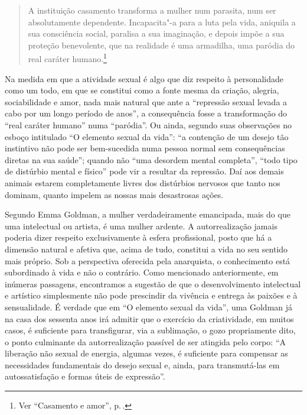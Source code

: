 \begin{quote}
A instituição casamento transforma a mulher num parasita, num ser
absolutamente dependente. Incapacita"-a para a luta pela vida, aniquila a
sua consciência social, paralisa a sua imaginação, e depois impõe a sua
proteção benevolente, que na realidade é uma armadilha, uma paródia do
real caráter humano.\footnote{Ver ``Casamento e amor'', p.\,\pageref{parasita}.}
\end{quote}

Na medida em que a
atividade sexual é algo que diz respeito à personalidade como um todo,
em que se constitui como a fonte mesma da criação, alegria,
sociabilidade e amor, nada mais natural que ante a ``repressão sexual
levada a cabo por um longo período de anos'', a consequência fosse
a transformação do ``real caráter humano'' numa
``paródia''. Ou ainda, segundo suas observações no esboço intitulado ``O
elemento sexual da vida'': ``a contenção de um desejo tão instintivo não
pode ser bem-sucedida numa pessoa normal sem consequências diretas na
sua saúde''; quando não ``uma desordem mental completa'', ``todo tipo de
distúrbio mental e físico'' pode vir a resultar da repressão. Daí aos
demais animais estarem completamente livres dos distúrbios nervosos que
tanto nos dominam, quanto impelem as nossas mais desastrosas ações.

Segundo Emma Goldman, a mulher verdadeiramente emancipada, mais do que
uma intelectual ou artista, é uma mulher ardente. A autorrealização
jamais poderia dizer respeito exclusivamente à esfera profissional,
posto que há a dimensão natural e afetiva que, acima de tudo, constitui
a vida no seu sentido mais próprio. Sob a perspectiva oferecida pela
anarquista, o conhecimento está subordinado à vida e não o contrário.
Como mencionado anteriormente, em inúmeras passagens, encontramos a
sugestão de que o desenvolvimento intelectual e artístico simplesmente
não pode prescindir da vivência e entrega às paixões e à sensualidade. É
verdade que em ``O elemento sexual da vida'', uma Goldman já na casa dos
sessenta anos irá admitir que o exercício da criatividade, em muitos
casos, é suficiente para transfigurar, via a sublimação, o gozo
propriamente dito, o ponto culminante da autorrealização passível de ser
atingida pelo corpo: ``A liberação não sexual de energia, algumas vezes,
é suficiente para compensar as necessidades fundamentais do desejo
sexual e, ainda, para transmutá-las em autossatisfação e formas úteis de
expressão''.

